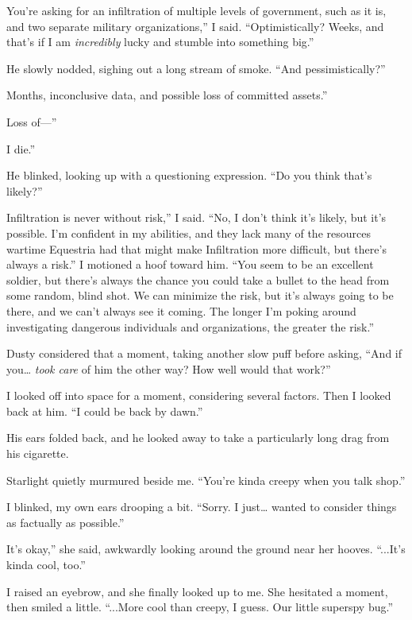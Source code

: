 \leavevmode{}You’re asking for an infiltration of multiple levels of government, such as it is, and two separate military organizations,” I said. “Optimistically? Weeks, and that’s if I am \textit{incredibly} lucky and stumble into something big.”

He slowly nodded, sighing out a long stream of smoke. “And pessimistically?”

\leavevmode{}Months, inconclusive data, and possible loss of committed assets.”

\leavevmode{}Loss of—”

\leavevmode{}I die.”

He blinked, looking up with a questioning expression. “Do you think that’s likely?”

\leavevmode{}Infiltration is never without risk,” I said. “No, I don’t think it’s likely, but it’s possible. I’m confident in my abilities, and they lack many of the resources wartime Equestria had that might make Infiltration more difficult, but there’s always a risk.” I motioned a hoof toward him. “You seem to be an excellent soldier, but there’s always the chance you could take a bullet to the head from some random, blind shot. We can minimize the risk, but it’s always going to be there, and we can’t always see it coming. The longer I’m poking around investigating dangerous individuals and organizations, the greater the risk.”

Dusty considered that a moment, taking another slow puff before asking, “And if you… \textit{took care} of him the other way? How well would that work?”

I looked off into space for a moment, considering several factors. Then I looked back at him. “I could be back by dawn.”

His ears folded back, and he looked away to take a particularly long drag from his cigarette.

Starlight quietly murmured beside me. “You’re kinda creepy when you talk shop.”

I blinked, my own ears drooping a bit. “Sorry. I just… wanted to consider things as factually as possible.”

\leavevmode{}It’s okay,” she said, awkwardly looking around the ground near her hooves. “...It’s kinda cool, too.”

I raised an eyebrow, and she finally looked up to me. She hesitated a moment, then smiled a little. “...More cool than creepy, I guess. Our little superspy bug.”

